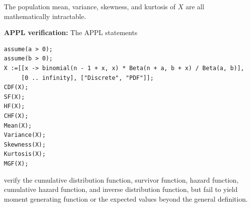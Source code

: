 \documentclass[12pt,fullpage]{article}
\begin{document}
\vspace{0.05in}

\noindent
The population mean, variance, skewness, and kurtosis of $X$ are all mathematically intractable.

\newpage

\noindent
{\bf APPL verification:}
The APPL statements
\begin{verbatim}
assume(a > 0);
assume(b > 0);
X :=[[x -> binomial(n - 1 + x, x) * Beta(n + a, b + x) / Beta(a, b)],
     [0 .. infinity], ["Discrete", "PDF"]];
CDF(X);
SF(X);
HF(X);
CHF(X);
Mean(X);
Variance(X);
Skewness(X);
Kurtosis(X);
MGF(X);
\end{verbatim}
verify the cumulative distribution function, survivor function, hazard function, cumulative hazard function,
and inverse distribution function, but fail to yield moment generating function or the expected values beyond the general definition.
\end{document}
